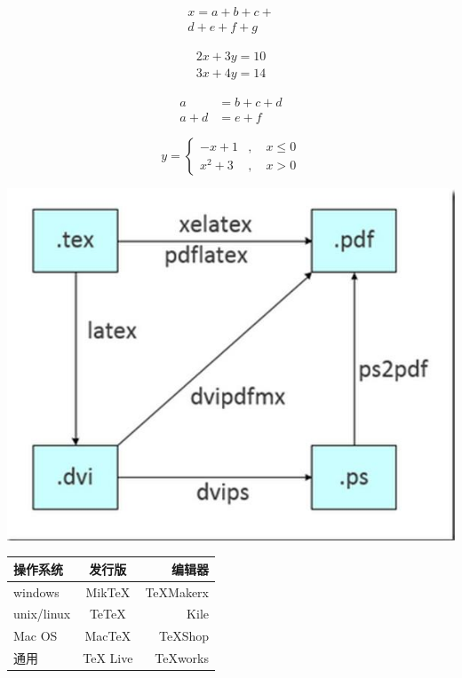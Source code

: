 \documentclass[UTF8]{ctexart} %
\begin{document}
\begin{multline} %
  x = a+b+c+{} \\
  d+e+f+g
  \end{multline}

\begin{gather} %
2x+3y = 10 \\
3x+4y = 14
\end{gather}

\[\begin{aligned} %
a &= b+c+d \\
a+d &= e+f
\end{aligned} \]

\[ y = \begin{cases} %
-x+1&,\quad x\leq 0 \\
x^2+3&,\quad x>0
\end{cases} \]

\includegraphics[width = .9\textwidth]{a.jpg} %

\begin{tabular}{|l|c|r|} %
\hline %
操作系统 & 发行版 & 编辑器 \\
\hline
windows & MikTeX & TeXMakerx \\
\hline
unix/linux &TeTeX & Kile \\
\hline
Mac OS & MacTeX & TeXShop \\
\hline
通用 & TeX Live & TeXworks \\
\hline
\end{tabular}
\end{document}
